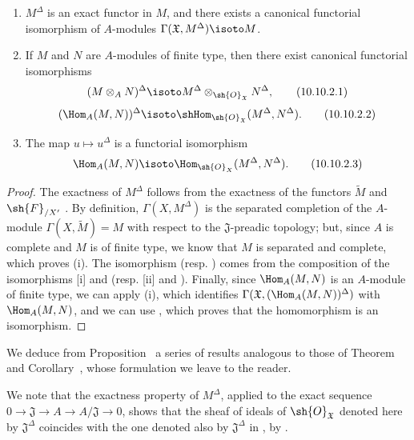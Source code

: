 \begin{proposition}[10.10.2]
\label{I.10.10.2}
\medskip\noindent
\begin{enumerate}
  \item[\rm{(i)}] $M^\Delta$ is an exact functor in $M$, and there exists a canonical functorial isomorphism of $A$-modules $\Gamma(\mathfrak{X},M^\Delta)\isoto M$.
  \item[\rm{(ii)}] If $M$ and $N$ are $A$-modules of finite type, then there exist canonical functorial isomorphisms
    \[
    \label{I.10.10.2.1}
      (M\otimes_A N)^\Delta\isoto M^\Delta\otimes_{\sh{O}_\mathfrak{X}}N^\Delta,
      \tag{10.10.2.1}
    \]
    \[
    \label{I.10.10.2.2}
      (\Hom_A(M,N))^\Delta\isoto\shHom_{\sh{O}_\mathfrak{X}}(M^\Delta,N^\Delta).
      \tag{10.10.2.2}
    \]
  \item[\rm{(iii)}] The map $u\mapsto u^\Delta$ is a functorial isomorphism
    \[
    \label{I.10.10.2.3}
      \Hom_A(M,N)\isoto\Hom_{\sh{O}_X}(M^\Delta,N^\Delta).
      \tag{10.10.2.3}
    \]
\end{enumerate}
\end{proposition}

\begin{proof}
The exactness of $M^\Delta$ follows from the exactness of the functors $\widetilde{M}$  and $\sh{F}_{/X'}$ .
By definition, $\Gamma(X,M^\Delta)$ is the separated completion of the $A$-module $\Gamma(X,\widetilde{M})=M$ with respect to the $\mathfrak{J}$-preadic topology; but, since $A$ is complete and $M$ is of finite type, we know  that $M$ is separated and complete, which proves (i).
The isomorphism  (resp. ) comes from the composition of the isomorphisms [i] and  (resp. [ii] and ).
Finally, since $\Hom_A(M,N)$ is an $A$-module of finite type, we can apply (i), which identifies $\Gamma(\mathfrak{X},(\Hom_A(M,N))^\Delta)$ with $\Hom_A(M,N)$, and we can use , which proves that the homomorphism  is an isomorphism.
\end{proof}

We deduce from Proposition~ a series of results analogous to those of Theorem~ and Corollary~, whose formulation we leave to the reader.

We note that the exactness property of $M^\Delta$, applied to the exact sequence $0\to\mathfrak{J}\to A\to A/\mathfrak{J}\to 0$, shows that the sheaf of ideals of $\sh{O}_\mathfrak{X}$ denoted here by $\mathfrak{J}^\Delta$ coincides with the one denoted also by $\mathfrak{J}^\Delta$ in , by .

